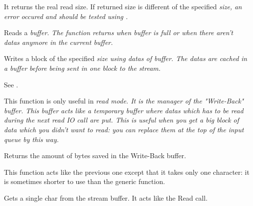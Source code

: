
It returns the real read size. If returned size is different of the specified 
\it{size}, an error occured and should be tested using 
.




Reads a \it{buffer}. The function returns when \it{buffer} is full or
when there aren't datas anymore in the current buffer.

\label{wxstreambufferwrite}


Writes a block of the specified \it{size} using datas of \it{buffer}. The datas
are cached in a buffer before being sent in one block to the stream.


See .

\label{wxstreambufferwriteback}


This function is only useful in \it{read} mode. It is the manager of the "Write-Back"
buffer. This buffer acts like a temporary buffer where datas which has to be 
read during the next read IO call are put. This is useful when you get a big
block of data which you didn't want to read: you can replace them at the top
of the input queue by this way.


Returns the amount of bytes saved in the Write-Back buffer.


This function acts like the previous one except that it takes only one
character: it is sometimes shorter to use than the generic function.



Gets a single char from the stream buffer. It acts like the Read call.

